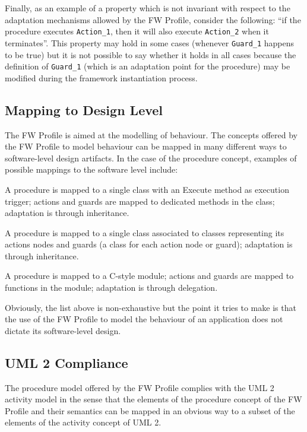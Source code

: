 \documentclass[a4paper,10pt]{article}
\newenvironment{fw_itemize}						%
{\begin{itemize}
  \setlength{\itemsep}{1mm}
  \setlength{\parskip}{0pt}
  \setlength{\parsep}{0pt}}
{\end{itemize}}
\begin{document}
Finally, as an example of a property which is not invariant with respect to the adaptation
mechanisms allowed by the FW Profile, consider the following: “if the procedure executes
\texttt{Action\_1}, then it will also execute \texttt{Action\_2} when it terminates”. This property may hold in some cases (whenever \texttt{Guard\_1} happens to be true) but it is not possible to say whether it holds in all cases because the definition of \texttt{Guard\_1} (which is an adaptation point for the procedure) may be modified during the framework instantiation process.

\subsection{Mapping to Design Level}\label{sec:procMappingToDesignLevel} 
The FW Profile is aimed at the modelling of behaviour. The concepts offered by the FW
Profile to model behaviour can be mapped in many different ways to software-level design
artifacts. In the case of the procedure concept, examples of possible mappings to the software level include:

\begin{fw_itemize} 
\item A procedure is mapped to a single class with an Execute method as execution trigger;
actions and guards are mapped to dedicated methods in the class; adaptation is through inheritance.
\item A procedure is mapped to a single class associated to classes representing its actions 
nodes and guards (a class for each action node or guard); adaptation is through inheritance.
\item A procedure is mapped to a C-style module; actions and guards are mapped to functions 
in the module; adaptation is through delegation.
\end{fw_itemize}

Obviously, the list above is non-exhaustive but the point it tries to make is that the use of the
FW Profile to model the behaviour of an application does not dictate its software-level design.

\subsection{UML 2 Compliance}
The procedure model offered by the FW Profile complies with the UML 2 activity model in
the sense that the elements of the procedure concept of the FW Profile and their semantics can
be mapped in an obvious way to a subset of the elements of the activity concept of UML 2.
\end{document}
